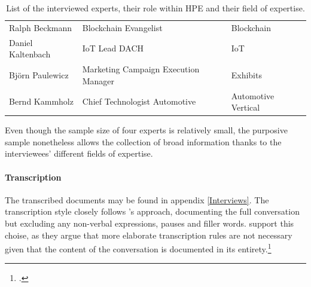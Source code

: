 \begin{table}[]  
    \centering
    \begin{tabular}{l|l|l}
        Ralph Beckmann & Blockchain Evangelist & Blockchain \\
        Daniel Kaltenbach & IoT Lead DACH & IoT \\
        Björn Paulewicz & Marketing Campaign Execution Manager & Exhibits \\
        Bernd Kammholz & Chief Technologist Automotive & Automotive Vertical \\
    \end{tabular}
    \caption{List of the interviewed experts, their role within HPE and their field of expertise.}
    \label{tab:Experts}
\end{table}

Even though the sample size of four experts is relatively small, the purposive sample nonetheless allows the collection of broad information thanks to the interviewees' different fields of expertise. 

\paragraph{Transcription} The transcribed documents may be found in appendix \ref{Interviews}. The transcription style closely follows \cite{KrugerqualitativeInhaltsanalyseMethode2004}'s approach, documenting the full conversation but excluding any non-verbal expressions, pauses and filler words. \cite{MeuserExpertInneninterviewsvielfacherprobt1991} support this choise, as they argue that more elaborate transcription rules are not necessary given that the content of the conversation is documented in its entirety.\footcite[Cf.][p.456]{MeuserExpertInneninterviewsvielfacherprobt1991}

